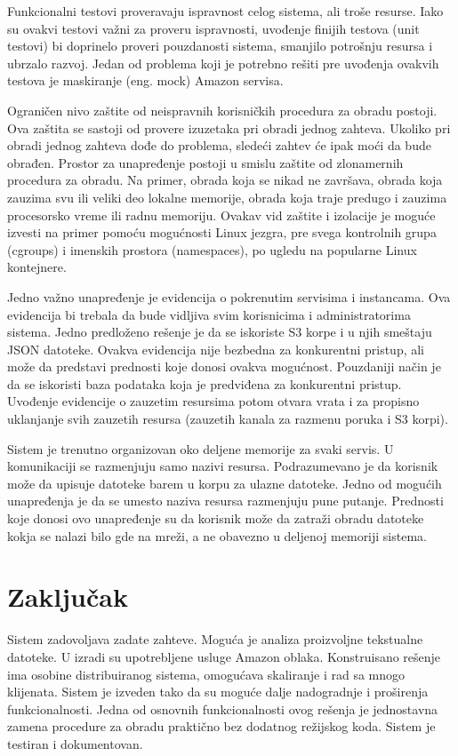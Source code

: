 \documentclass[a4paper]{article}
\begin{document}
Funkcionalni testovi proveravaju ispravnost celog sistema, ali troše resurse.
Iako su ovakvi testovi važni za proveru ispravnosti, uvođenje finijih testova
(unit testovi) bi doprinelo proveri pouzdanosti sistema, smanjilo potrošnju
resursa i ubrzalo razvoj. Jedan od problema koji je potrebno rešiti pre uvođenja
ovakvih testova je maskiranje (eng. mock) Amazon servisa.

Ograničen nivo zaštite od neispravnih korisničkih procedura za obradu postoji.
Ova zaštita se sastoji od provere izuzetaka pri obradi jednog zahteva. Ukoliko
pri obradi jednog zahteva dođe do problema, sledeći zahtev će ipak moći da bude
obrađen. Prostor za unapređenje postoji u smislu zaštite od zlonamernih
procedura za obradu. Na primer, obrada koja se nikad ne završava, obrada koja
zauzima svu ili veliki deo lokalne memorije, obrada koja traje predugo i zauzima
procesorsko vreme ili radnu memoriju. Ovakav vid zaštite i izolacije je moguće
izvesti na primer pomoću mogućnosti Linux jezgra, pre svega kontrolnih grupa
(cgroups) i imenskih prostora (namespaces), po ugledu na popularne Linux
kontejnere.

Jedno važno unapređenje je evidencija o pokrenutim servisima i instancama. Ova
evidencija bi trebala da bude vidljiva svim korisnicima i administratorima
sistema. Jedno predloženo rešenje je da se iskoriste S3 korpe i u njih smeštaju
JSON datoteke. Ovakva evidencija nije bezbedna za konkurentni pristup, ali može
da predstavi prednosti koje donosi ovakva mogućnost. Pouzdaniji način je da se
iskoristi baza podataka koja je predviđena za konkurentni pristup. Uvođenje
evidencije o zauzetim resursima potom otvara vrata i za propisno uklanjanje svih
zauzetih resursa (zauzetih kanala za razmenu poruka i S3 korpi).

Sistem je trenutno organizovan oko deljene memorije za svaki servis. U
komunikaciji se razmenjuju samo nazivi resursa. Podrazumevano je da korisnik
može da upisuje datoteke barem u korpu za ulazne datoteke. Jedno od mogućih
unapređenja je da se umesto naziva resursa razmenjuju pune putanje. Prednosti
koje donosi ovo unapređenje su da korisnik može da zatraži obradu datoteke kokja
se nalazi bilo gde na mreži, a ne obavezno u deljenoj memoriji sistema.

\newpage
\section{Zaključak}

Sistem zadovoljava zadate zahteve. Moguća je analiza proizvoljne tekstualne
datoteke. U izradi su upotrebljene usluge Amazon oblaka. Konstruisano rešenje
ima osobine distribuiranog sistema, omogućava skaliranje i rad sa mnogo
klijenata. Sistem je izveden tako da su moguće dalje nadogradnje i proširenja
funkcionalnosti. Jedna od osnovnih funkcionalnosti ovog rešenja je jednostavna
zamena procedure za obradu praktično bez dodatnog režijskog koda. Sistem je
testiran i dokumentovan.
\end{document}
